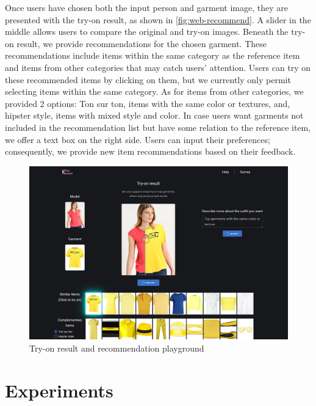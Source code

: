 Once users have chosen both the input person and garment image, they are presented with the try-on result, as shown in \autoref{fig:web-recommend}. A slider in the middle allows users to compare the original and try-on images. Beneath the try-on result, we provide recommendations for the chosen garment. These recommendations include items within the same category as the reference item and items from other categories that may catch users' attention. Users can try on these recommended items by clicking on them, but we currently only permit selecting items within the same category. As for items from other categories, we provided 2 options: Ton sur ton, items with the same color or textures, and, hipster style, items with mixed style and color. In case users want garments not included in the recommendation list but have some relation to the reference item, we offer a text box on the right side. Users can input their preferences; consequently, we provide new item recommendations based on their feedback.

\begin{figure}[h!]
  \centering
  \includegraphics[width=\textwidth]{content/resources/images/application/web-recommend.png}
  \caption{Try-on result and recommendation playground}
  \label{fig:web-recommend}
\end{figure}

\section{Experiments}

